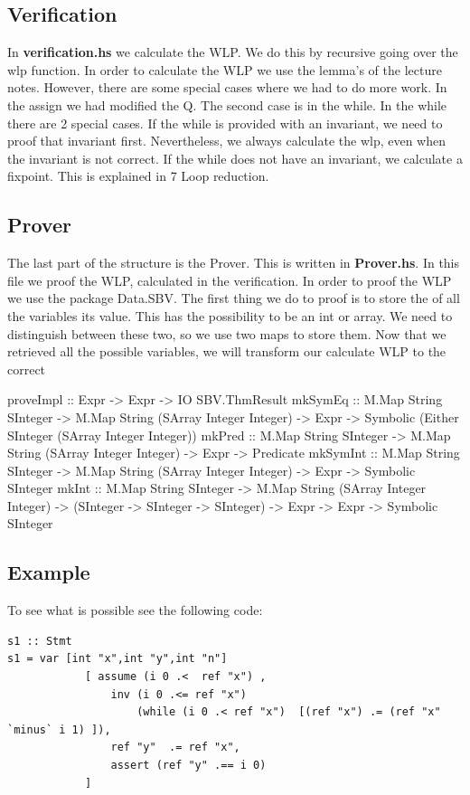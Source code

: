 \documentclass{article}
\begin{document}
\subsection{Verification}
In \textbf{verification.hs} we calculate the WLP. We do this by recursive going over the wlp function. In order to calculate the WLP we use the lemma's of the lecture notes. However, there are some special cases where we had to do more work. In the assign we had modified the Q. The second case is in the while. In the while there are 2 special cases. If the while is provided with an invariant, we need to proof that invariant first. Nevertheless,  we always calculate the wlp, even when the invariant is not correct. If the while does not have an invariant, we calculate a fixpoint. This is explained in 7 Loop reduction.



\subsection{Prover}
The last part of the structure is the Prover. This is written in \textbf{Prover.hs}. In this file we proof the WLP, calculated in the verification. In order to proof the WLP we use the package Data.SBV. The first thing we do to proof is to store the of all the variables its value. This has the possibility to be an int or array. We need to distinguish between these two, so we use two maps to store them. Now that we retrieved all the possible variables, we will  transform our calculate WLP to the correct 

proveImpl :: Expr -> Expr -> IO SBV.ThmResult
mkSymEq :: M.Map String SInteger -> M.Map String (SArray Integer Integer) -> Expr -> Symbolic (Either SInteger (SArray Integer Integer))
mkPred :: M.Map String SInteger -> M.Map String (SArray Integer Integer) -> Expr -> Predicate
mkSymInt :: M.Map String SInteger -> M.Map String (SArray Integer Integer) -> Expr -> Symbolic SInteger
mkInt :: M.Map String SInteger -> M.Map String (SArray Integer Integer) -> (SInteger -> SInteger -> SInteger) -> Expr -> Expr -> Symbolic SInteger


\subsection{Example}
To see what is possible see the following code:
\begin{lstlisting}
s1 :: Stmt
s1 = var [int "x",int "y",int "n"] 
            [ assume (i 0 .<  ref "x") ,
                inv (i 0 .<= ref "x")
                    (while (i 0 .< ref "x")  [(ref "x") .= (ref "x" `minus` i 1) ]),
                ref "y"  .= ref "x",
                assert (ref "y" .== i 0)
            ]
\end{lstlisting}
 
\end{document}

